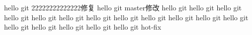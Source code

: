 hello git 22222222222222修复
hello git master修改
hello git
hello git
hello git
hello git
hello git
hello git
hello git
hello git
hello git
hello git
hello git
hello git
hello git
hello git
hello git
hello git
hello git hot-fix


